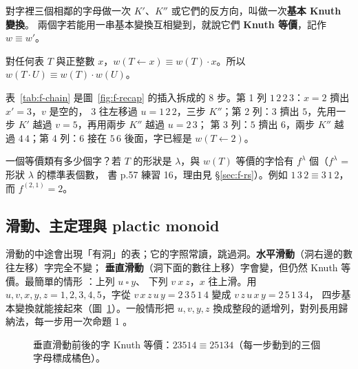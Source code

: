 \begin{keybox}[Knuth 等價]
對字裡三個相鄰的字母做一次 $K'$、$K''$ 或它們的反方向，叫做一次\textbf{基本 Knuth 變換}。
兩個字若能用一串基本變換互相變到，就說它們 \textbf{Knuth 等價}，記作 $w\equiv w'$。
\end{keybox}

\begin{thmbox}[命題 1 \fulref{p.19}]
對任何表 $T$ 與正整數 $x$，$w(T\leftarrow x)\equiv w(T)\cdot x$。所以 $w(T\cdot U)\equiv w(T)\cdot w(U)$。
\end{thmbox}

表~\ref{tab:f-chain} 是圖~\ref{fig:f-recap} 的插入拆成的 8 步。第 1 列 $1\,2\,2\,3$：$x=2$ 擠出 $x'=3$，$v$ 是空的，
$3$ 往左移過 $u=1\,2\,2$，三步 $K''$；第 2 列：$3$ 擠出 $5$，先用一步 $K'$ 越過 $v=5$，再用兩步 $K''$ 越過 $u=2\,3$；
第 3 列：$5$ 擠出 $6$，兩步 $K''$ 越過 $4\,4$；第 4 列：$6$ 接在 $5\,6$ 後面，字已經是 $w(T\leftarrow 2)$。

\begin{table}[H]
\centering
\FulChain
\caption{$w(T)\cdot 2\equiv w(T\leftarrow 2)$ 的 8 步基本變換（每一步動到的三個字母標成橘色）。}
\label{tab:f-chain}
\end{table}

\begin{notebox}
一個等價類有多少個字？若 $T$ 的形狀是 $\lambda$，與 $w(T)$ 等價的字恰有 $f^\lambda$ 個（$f^\lambda$ = 形狀 $\lambda$ 的標準表個數，
書 p.57 練習 16，理由見 \S\ref{sec:f-rs}）。例如 $1\,3\,2\equiv 3\,1\,2$，而 $f^{(2,1)}=2$。
\end{notebox}

\subsection{滑動、主定理與 plactic monoid}\label{sec:f-slides}

滑動的中途會出現「有洞」的表；它的字照常讀，跳過洞。\textbf{水平滑動}（洞右邊的數往左移）字完全不變；
\textbf{垂直滑動}（洞下面的數往上移）字會變，但仍然 Knuth 等價。最簡單的情形 ：上列 $u\ \square\ y$、
下列 $v\ x\ z$，$x$ 往上滑。用 $u,v,x,y,z=1,2,3,4,5$，字從 $v\,x\,z\,u\,y=2\,3\,5\,1\,4$ 變成 $v\,z\,u\,x\,y=2\,5\,1\,3\,4$，
四步基本變換就能接起來（圖~\ref{fig:f-slide}）。一般情形把 $u,v,y,z$ 換成整段的遞增列，對列長用歸納法，每一步用一次命題 1 。

\begin{figure}[H]
\centering
\FulSlide
\caption{垂直滑動前後的字 Knuth 等價：$23514\equiv 25134$（每一步動到的三個字母標成橘色）。}
\label{fig:f-slide}
\end{figure}


